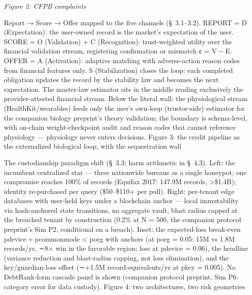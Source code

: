 \documentclass[
]{article}
\begin{document}
\emph{Figure 2: CFPB complaints}

Report {→} Score {→} Offer mapped to the five channels (§~3.1--3.2).
REPORT = D (Expectation): the user-owned record is the market's
expectation of the user. SCORE = O (Validation) + C (Recognition):
trust-weighted utility over the financial validation stream, registering
confirmation or mismatch {ε = V − E}. OFFER = A (Activation): adaptive
matching with adverse-action reason codes from financial features only.
S (Stabilization) closes the loop: each completed obligation updates the
record by the stability law and becomes the next expectation. The
master-law estimator sits in the middle reading exclusively the
provider-attested financial stream. Below the literal wall: the
physiological stream (HealthKit/wearables) feeds only the user's
own-loop (trustor-side) estimator for the companion biology preprint's
theory validation; the boundary is schema-level, with on-chain
weight-checkpoint audit and reason codes that cannot reference
physiology --- physiology never enters decisions. Figure 3: the credit
pipeline as the externalized biological loop, with the sequestration
wall

The custodianship paradigm shift (§~3.3; harm arithmetic in §~4.3).
Left: the incumbent centralized star --- three nationwide bureaus as a
single honeypot; one compromise reaches 100\% of records (Equifax 2017:
147.9M records, {\textgreater{}}\$1.4B); identity re-purchased per query
(\$50--\$110+ per pull). Right: per-tenant edge databases with user-held
keys under a blockchain anchor --- local immutability via hash-anchored
state transitions, no aggregate vault, blast radius capped at the
breached tenant by construction (0.2\% at {N = 500}, the companion
protocol preprint's Sim P2, conditional on a breach). Inset: the
expected-loss break-even {pdevice + pcommonmode \textless{} porg} with
anchors (at {porg = 0.05}: 15M vs 1.8M records/yr, {∼}8{×} win in the
favorable region; loss at {pdevice = 0.06}), the headline (variance
reduction and blast-radius capping, not loss elimination), and the
key/guardian-loss offset ({∼}+1.5M record-equivalents/yr at
{pkey = 0.005}). No DebtRank-form cascade panel is shown (companion
protocol preprint, Sim P6: category error for data custody). Figure 4:
two architectures, two risk geometries
\end{document}
